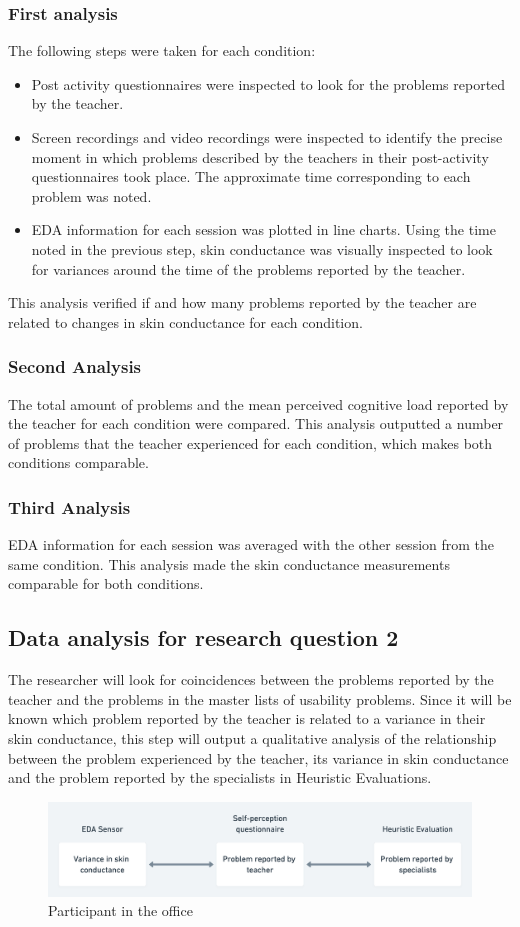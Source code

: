 \subsubsection{First analysis}
The following steps were taken for each condition:
\begin{itemize}
    \item Post activity questionnaires were inspected to look for the problems reported by the teacher.
    \item Screen recordings and video recordings were inspected to identify the precise moment in which problems described by the teachers in their post-activity questionnaires took place. The approximate time corresponding to each problem was noted.
    \item EDA information for each session was plotted in line charts. Using the time noted in the previous step, skin conductance was visually inspected to look for variances around the time of the problems reported by the teacher.
\end{itemize}
This analysis verified if and how many problems reported by the teacher are related to changes in skin conductance for each condition.
\subsubsection{Second Analysis}
The total amount of problems and the mean perceived cognitive load reported by the teacher for each condition were compared. This analysis outputted a number of problems that the teacher experienced for each condition, which makes both conditions comparable.
\subsubsection{Third Analysis}
EDA information for each session was averaged with the other session from the same condition. This analysis made the skin conductance measurements comparable for both conditions.
\subsection{Data analysis for research question 2}
The researcher will look for coincidences between the problems reported by the teacher and the problems in the master lists of usability problems. Since it will be known which problem reported by the teacher is related to a variance in their skin conductance, this step will output a qualitative analysis of the relationship between the problem experienced by the teacher, its variance in skin conductance and the problem reported by the specialists in Heuristic Evaluations.
\begin{figure}[!h]
    \includegraphics[clip,width=\columnwidth]{Figures/Heuristic-evaluation-diagram.png} 
\caption{Participant in the office} 
\label{fig:table}
\end{figure}
